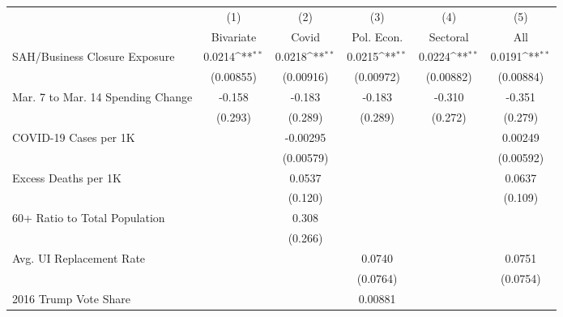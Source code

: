 {
\def\sym#1{\ifmmode^{#1}\else\(^{#1}\)\fi}
\begin{tabular}{l*{5}{c}}
\hline\hline
            &\multicolumn{1}{c}{(1)}         &\multicolumn{1}{c}{(2)}         &\multicolumn{1}{c}{(3)}         &\multicolumn{1}{c}{(4)}         &\multicolumn{1}{c}{(5)}         \\
            &   Bivariate         &       Covid         &  Pol. Econ.         &    Sectoral         &         All         \\
\hline
SAH/Business Closure Exposure&      0.0214\sym{**} &      0.0218\sym{**} &      0.0215\sym{**} &      0.0224\sym{**} &      0.0191\sym{**} \\
            &   (0.00855)         &   (0.00916)         &   (0.00972)         &   (0.00882)         &   (0.00884)         \\
Mar. 7 to Mar. 14 Spending Change&      -0.158         &      -0.183         &      -0.183         &      -0.310         &      -0.351         \\
            &     (0.293)         &     (0.289)         &     (0.289)         &     (0.272)         &     (0.279)         \\
COVID-19 Cases per 1K&                     &    -0.00295         &                     &                     &     0.00249         \\
            &                     &   (0.00579)         &                     &                     &   (0.00592)         \\
Excess Deaths per 1K&                     &      0.0537         &                     &                     &      0.0637         \\
            &                     &     (0.120)         &                     &                     &     (0.109)         \\
60+ Ratio to Total Population&                     &       0.308         &                     &                     &                     \\
            &                     &     (0.266)         &                     &                     &                     \\
Avg. UI Replacement Rate&                     &                     &      0.0740         &                     &      0.0751         \\
            &                     &                     &    (0.0764)         &                     &    (0.0754)         \\
2016 Trump Vote Share&                     &                     &     0.00881         &                     &                     \\

\end{tabular}}
